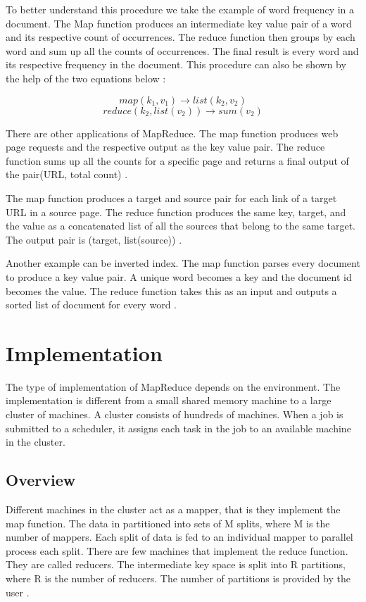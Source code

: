 \documentclass[sigconf]{acmart}
\begin{document}
To better understand this procedure we take the example of word frequency in a document. The Map function produces an intermediate key value pair of a word and its respective count of occurrences. The reduce function then groups by each word and sum up all the counts of occurrences. The final result is every word and its respective frequency in the document.  This procedure can also be shown by the help of the two equations below \cite{rf2}:

\[map    (k_1,v_1) \rightarrow  list(k_2,v_2) \]
\[reduce (k_2,list(v_2)) \rightarrow sum(v_2)\]

There are other applications of MapReduce. The map function produces web page requests and the respective output as the key value pair. The reduce function sums up all the counts for a specific page and returns a final output of the pair(URL, total count) \cite{rf2}. 

The map function produces a target and source pair for each link of a target URL in a source page. The reduce function produces the same key, target, and the value as a concatenated list of all the sources that belong to the same target. The output pair is (target, list(source)) \cite{rf4}.

 Another example can be inverted index. The map function parses every document to produce a key value pair.  A unique word becomes a key and the document id becomes the value.  The reduce function takes this as an input and outputs a sorted list of document for every word \cite{rf2}. 
\section{Implementation}
 The type of implementation of MapReduce depends on the environment. The implementation is different from a small shared memory machine to a large cluster of machines.  A cluster consists of hundreds of machines. When a job is submitted to a scheduler, it assigns each task in the job to an available machine in the cluster.
\subsection{Overview}  
Different machines in the cluster act as a mapper, that is they implement the map function. The data in partitioned into sets of M splits, where M is the number of mappers. Each split of data is fed to an individual mapper to parallel process each split. There are few machines that implement the reduce function. They are called reducers. The intermediate key space is split into R partitions, where R is the number of reducers. The number of partitions is provided by the user \cite{rf2}. 
\end{document}
